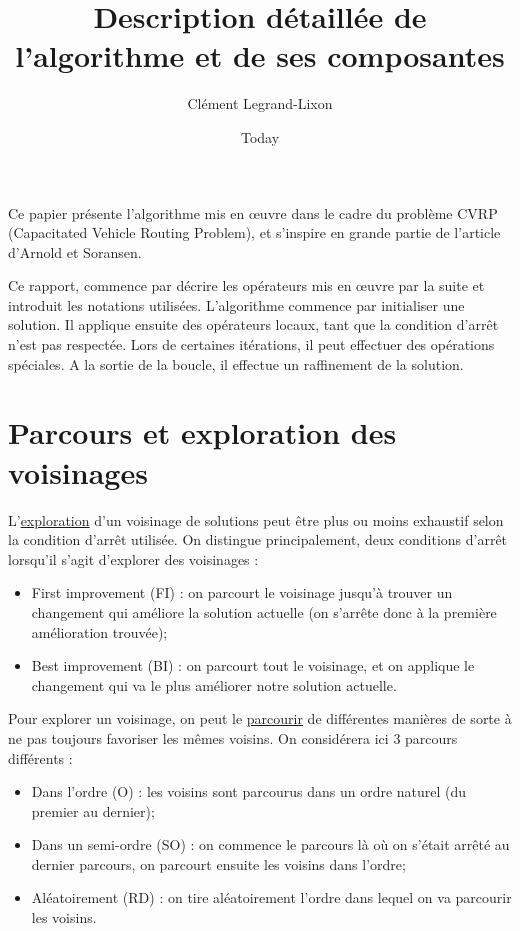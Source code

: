 \documentclass[a4paper,11pt]{article}%
\begin{document}
\title{Description détaillée de l'algorithme et de ses composantes}

\author{Clément Legrand-Lixon}

\date{Today}

\maketitle

Ce papier présente l'algorithme mis en œuvre dans le cadre du problème CVRP (Capacitated Vehicle Routing Problem), et s'inspire en grande partie de l'article d'Arnold et Soransen. 

Ce rapport, commence par décrire les opérateurs mis en œuvre par la suite  et introduit les notations utilisées.   
L'algorithme commence par initialiser une solution. Il applique ensuite des opérateurs locaux, tant que la condition d'arrêt n'est pas respectée. Lors de certaines itérations, il peut effectuer des opérations spéciales. A la sortie de la boucle, il effectue un raffinement de la solution.

\section*{Parcours et exploration des voisinages}

L'\underline{exploration} d'un voisinage de solutions peut être plus ou moins exhaustif selon la condition d'arrêt utilisée.
On distingue principalement, deux conditions d'arrêt lorsqu'il s'agit d'explorer des voisinages :

\begin{itemize}
\item First improvement (FI) : on parcourt le voisinage jusqu'à trouver un changement qui améliore la solution actuelle (on s'arrête donc à la première amélioration trouvée);
\item Best improvement (BI) : on parcourt tout le voisinage, et on applique le changement qui va le plus améliorer notre solution actuelle. \\
\end{itemize}

Pour explorer un voisinage, on peut le \underline{parcourir} de différentes manières de sorte à ne pas toujours favoriser les mêmes voisins. On considérera ici 3 parcours différents : 

\begin{itemize}
\item Dans l'ordre (O) : les voisins sont parcourus dans un ordre naturel (du premier au dernier);
\item Dans un semi-ordre (SO) : on commence le parcours là où on s'était arrêté au dernier parcours, on parcourt ensuite les voisins dans l'ordre;
\item Aléatoirement (RD) : on tire aléatoirement l'ordre dans lequel on va parcourir les voisins. \\
\end{itemize}
\end{document}
